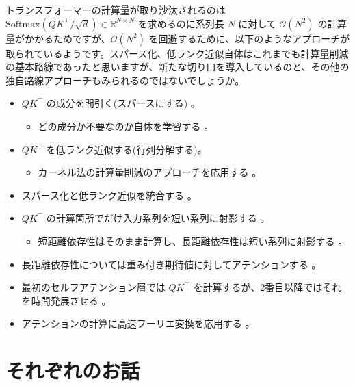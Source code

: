\documentclass[b5paper,xelatex,ja=standard,10pt]{bxjsarticle}
\begin{document}
トランスフォーマーの計算量が取り沙汰されるのは $\mathrm{Softmax} \left( Q K ^\top / \sqrt{d} \right) \in \mathbb{R}^{N \times N}$ を求めるのに系列長 $N$ に対して $\mathcal{O}(N^2)$ の計算量がかかるためですが、$\mathcal{O}(N^2)$ を回避するために、以下のようなアプローチが取られているようです。スパース化、低ランク近似自体はこれまでも計算量削減の基本路線であったと思いますが、新たな切り口を導入しているのと、その他の独自路線アプローチもみられるのではないでしょうか。
\begin{itemize}
  \item $Q K ^\top$ の成分を間引く(スパースにする) 。
  \begin{itemize}
    \item どの成分か不要なのか自体を学習する \cite{SebastianJaszczur2021}。
  \end{itemize}
  \item $Q K ^\top$ を低ランク近似する(行列分解する)。
  \begin{itemize}
    \item カーネル法の計算量削減のアプローチを応用する \cite{YifanChen2021}。
  \end{itemize}
  \item スパース化と低ランク近似を統合する \cite{BeidiChen2021}。
  \vspace{5pt}
  \item $Q K ^\top$ の計算箇所でだけ入力系列を短い系列に射影する \cite{XuezheMa2021}。
  \begin{itemize}
    \item 短距離依存性はそのまま計算し、長距離依存性は短い系列に射影する \cite{ChenZhu2021}。
  \end{itemize}
  \vspace{5pt}
  \item 長距離依存性については重み付き期待値に対してアテンションする \cite{HongyuRen2021}。
  \vspace{5pt}
  \item 最初のセルフアテンション層では $Q K ^\top$ を計算するが、2番目以降ではそれを時間発展させる \cite{SubhabrataDutta2021}。
  \vspace{5pt}
  \item アテンションの計算に高速フーリエ変換を応用する \cite{ShengjieLuo2021}。
\end{itemize}


\section*{それぞれのお話}
\end{document}
